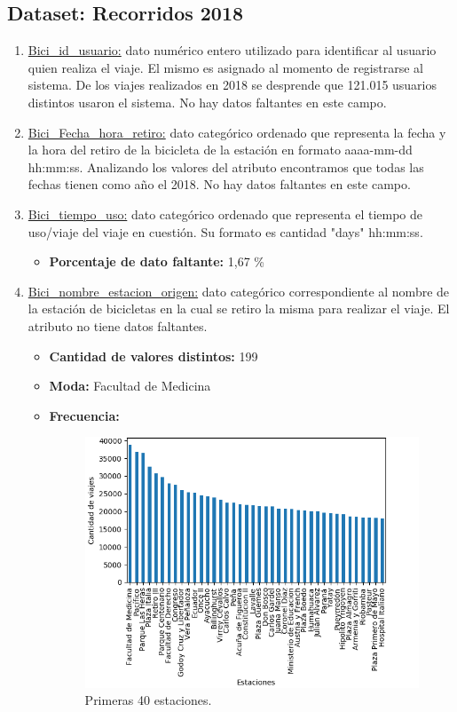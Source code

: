 \subsection{Dataset: Recorridos 2018}
\begin{enumerate}
    \item \underline{Bici_id_usuario:} dato numérico entero utilizado para identificar al usuario quien realiza el viaje. El mismo es asignado al momento de registrarse al sistema. De los viajes realizados en 2018 se desprende que 121.015 usuarios distintos usaron el sistema. No hay datos faltantes en este campo.
    \item \underline{Bici_Fecha_hora_retiro:} dato categórico ordenado que representa la fecha y la hora del retiro de la bicicleta de la estación en formato aaaa-mm-dd hh:mm:ss. Analizando los valores del atributo encontramos que todas las fechas tienen como año el 2018. No hay datos faltantes en este campo.
    \item \underline{Bici_tiempo_uso:} dato categórico ordenado que representa el tiempo de uso/viaje del viaje en cuestión. Su formato es cantidad "days" hh:mm:ss.
        \begin{itemize}
            \item \textbf{Porcentaje de dato faltante:} 1,67 \%
        \end{itemize}    
    \item \underline{Bici_nombre_estacion_origen:} dato categórico correspondiente al nombre de la estación de bicicletas en la cual se retiro la misma para realizar el viaje. El atributo no tiene datos faltantes.
        \begin{itemize}
            \item \textbf{Cantidad de valores distintos:} 199
            \item \textbf{Moda:} Facultad de Medicina
            \item \textbf{Frecuencia:}
\begin{figure}[H]
    \centering
    \includegraphics[scale=0.8]{imagenes/nombreOrigenEst1.png}
    \caption{Primeras 40 estaciones.}
 \label{fig: cluster}
\end{figure}


\end{itemize}
\end{enumerate}
